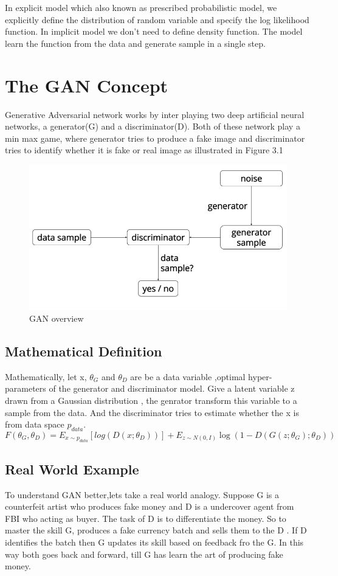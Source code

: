 In explicit model which also known as prescribed probabilistic model, we explicitly define the distribution of random variable and specify the log likelihood function.
In implicit model we don't need to define density function\cite{1}. The model learn the function from the data and generate sample in a single step.

\section{The GAN  Concept}
Generative Adversarial network works by inter playing two deep artificial neural networks, a generator(G) and a discriminator(D). Both of these network play a min max game, where generator tries to produce a fake image and discriminator tries to identify whether it is fake or real image as illustrated in Figure 3.1 
\begin{figure}[t]

  \centering
    \includegraphics[scale=.4, angle=0]{Files/gan-overview.png}
    \caption[GAN overview]{ GAN overview\cite{Gan-overview}}
    \label{fig: GAN-Overview}
\end{figure}
\newpage
\subsection{Mathematical Definition}
Mathematically, let x,  $\theta_{G}$  and $\theta_{D}$ are be a data variable ,optimal hyper-parameters of the generator and discriminator model. Give a latent variable z drawn from a Gaussian distribution  , the genrator transform this variable to a sample from the data. And the discriminator tries to estimate whether the x is from data space $p_{data}$.
$$ F (\theta_{G}, \theta_{D}) = E_{x\sim p_{data}} [log (D (x; \theta_{D}))] + E_{z\sim N(0,I)}\log (1- D(G (z; \theta_{G}) ; \theta_{D}))$$
\subsection{Real World Example}
To understand GAN better,lets take a real world analogy. Suppose G is a counterfeit artist who produces fake money and D is a undercover agent from FBI who acting as buyer. The task of D is to differentiate the money. So to master the skill G, produces a fake currency batch and sells them to the D . If D identifies the batch then G updates its skill based on feedback fro the G. In this way  both goes back and forward, till G has learn the art of producing fake money.



